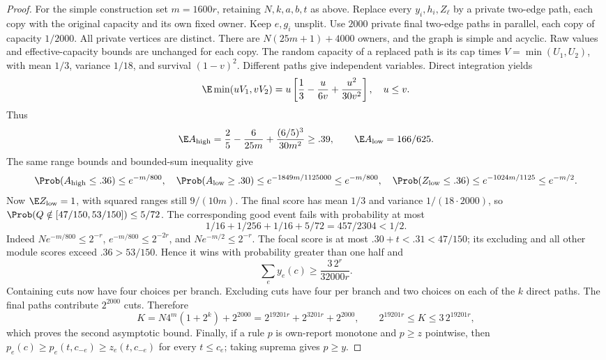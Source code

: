 \begin{proof}
For the simple construction set $m=1600r$, retaining $N,k,a,b,t$ as above.
Replace every $y_i,h_i,Z_\ell$ by a private two-edge path, each copy with
the original capacity and its own fixed owner.  Keep $e,g_i$ unsplit.
Use $2000$ private final two-edge paths in parallel, each copy of capacity
$1/2000$.  All private vertices are distinct.  There are
$N(25m+1)+4000$ owners, and the graph is simple and acyclic.
Raw values and effective-capacity bounds are unchanged for each copy.
The random capacity of a replaced path is its cap times
$V=\min(U_1,U_2)$, with mean $1/3$, variance $1/18$, and survival $(1-v)^2$.
Different paths give independent variables.  Direct integration yields
\[
 \E\min(uV_1,vV_2)=u\left[\frac13-\frac{u}{6v}
                                      +\frac{u^2}{30v^2}\right],\quad u\le v.
\]
Thus
\[
 \E A_{\rm high}=\frac25-\frac6{25m}+\frac{(6/5)^3}{30m^2}
       \ge.39,\qquad \E A_{\rm low}=166/625.
\]
The same range bounds and bounded-sum inequality give
\[
 \Prob(A_{\rm high}\le.36)\le e^{-m/800},\quad
 \Prob(A_{\rm low}\ge.30)\le e^{-1849m/1125000}\le e^{-m/800},
 \quad \Prob(Z_{\rm low}\le.36)\le e^{-1024m/1125}\le e^{-m/2}.
\]
Now $\E Z_{\rm low}=1$, with squared ranges still $9/(10m)$.
The final score has mean $1/3$ and variance $1/(18\cdot2000)$, so
$\Prob(Q\notin[47/150,53/150])\le5/72$.
The corresponding good event fails with probability at most
\[
 1/16+1/256+1/16+5/72=457/2304<1/2.
\]
Indeed $Ne^{-m/800}\le2^{-r}$, $e^{-m/800}\le2^{-2r}$, and
$Ne^{-m/2}\le2^{-r}$.  The focal score is at most
$.30+t<.31<47/150$; its excluding and all other module scores exceed
$.36>53/150$.  Hence it wins with probability greater than one half and
\[
 \sum_ey_e(c)\ge\frac{3\,2^r}{32000r}.
\]
Containing cuts now have four choices per branch.  Excluding cuts have
four per branch and two choices on each of the $k$ direct paths.  The final
paths contribute $2^{2000}$ cuts.  Therefore
\[
 K=N4^m(1+2^k)+2^{2000}
   =2^{19201r}+2^{3201r}+2^{2000},\qquad
 2^{19201r}\le K\le3\,2^{19201r},
\]
which proves the second asymptotic bound.
Finally, if a rule $p$ is own-report monotone and $p\ge z$ pointwise, then
$p_e(c)\ge p_e(t,c_{-e})\ge z_e(t,c_{-e})$ for every $t\le c_e$;
taking suprema gives $p\ge y$.
\end{proof}

